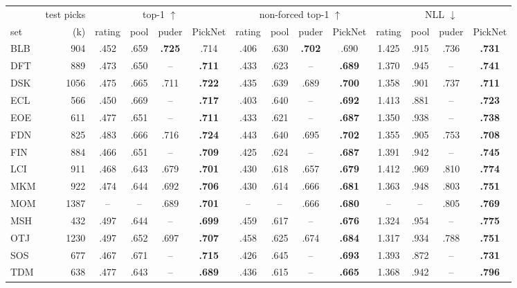\begin{tabular}{lr cccc cccc cccc}
\toprule
 & test picks & \multicolumn{4}{c}{top-1 $\uparrow$} & \multicolumn{4}{c}{non-forced top-1 $\uparrow$} & \multicolumn{4}{c}{NLL $\downarrow$} \\
\cmidrule(lr){3-6}\cmidrule(lr){7-10}\cmidrule(lr){11-14}
set & (k) & rating & pool & puder & PickNet & rating & pool & puder & PickNet & rating & pool & puder & PickNet \\
\midrule
BLB & 904 & .452 & .659 & \textbf{.725} & .714 & .406 & .630 & \textbf{.702} & .690 & 1.425 & .915 & .736 & \textbf{.731} \\
DFT & 889 & .473 & .650 & -- & \textbf{.711} & .433 & .623 & -- & \textbf{.689} & 1.370 & .945 & -- & \textbf{.741} \\
DSK & 1056 & .475 & .665 & .711 & \textbf{.722} & .435 & .639 & .689 & \textbf{.700} & 1.358 & .901 & .737 & \textbf{.711} \\
ECL & 566 & .450 & .669 & -- & \textbf{.717} & .403 & .640 & -- & \textbf{.692} & 1.413 & .881 & -- & \textbf{.723} \\
EOE & 611 & .477 & .651 & -- & \textbf{.711} & .433 & .621 & -- & \textbf{.687} & 1.350 & .938 & -- & \textbf{.738} \\
FDN & 825 & .483 & .666 & .716 & \textbf{.724} & .443 & .640 & .695 & \textbf{.702} & 1.355 & .905 & .753 & \textbf{.708} \\
FIN & 884 & .466 & .651 & -- & \textbf{.709} & .425 & .624 & -- & \textbf{.687} & 1.391 & .942 & -- & \textbf{.745} \\
LCI & 911 & .468 & .643 & .679 & \textbf{.701} & .430 & .618 & .657 & \textbf{.679} & 1.412 & .969 & .810 & \textbf{.774} \\
MKM & 922 & .474 & .644 & .692 & \textbf{.706} & .430 & .614 & .666 & \textbf{.681} & 1.363 & .948 & .803 & \textbf{.751} \\
MOM & 1387 & -- & -- & .689 & \textbf{.701} & -- & -- & .666 & \textbf{.680} & -- & -- & .805 & \textbf{.769} \\
MSH & 432 & .497 & .644 & -- & \textbf{.699} & .459 & .617 & -- & \textbf{.676} & 1.324 & .954 & -- & \textbf{.775} \\
OTJ & 1230 & .497 & .652 & .697 & \textbf{.707} & .458 & .625 & .674 & \textbf{.684} & 1.317 & .934 & .788 & \textbf{.751} \\
SOS & 677 & .467 & .671 & -- & \textbf{.715} & .426 & .645 & -- & \textbf{.693} & 1.393 & .872 & -- & \textbf{.731} \\
TDM & 638 & .477 & .643 & -- & \textbf{.689} & .436 & .615 & -- & \textbf{.665} & 1.368 & .942 & -- & \textbf{.796} \\

\end{tabular}
